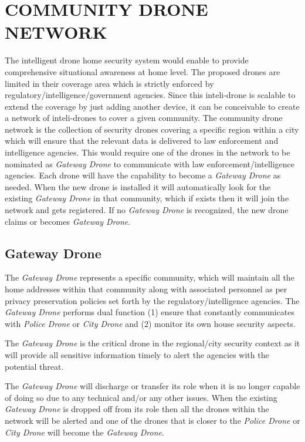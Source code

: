 \documentclass[sigconf]{acmart}
\begin{document}
\section{COMMUNITY DRONE NETWORK}
The intelligent drone home security system would enable to provide comprehensive situational awareness at home level. The proposed drones are limited in their coverage area which is strictly enforced by regulatory/intelligence/government agencies. Since this inteli-drone is scalable to extend the coverage by just adding another device, it can be conceivable to create a network of inteli-drones to cover a given community. The community drone network is the collection of security drones covering a specific region within a city which will ensure that the relevant data is delivered to law enforcement and intelligence agencies. This would require one of the drones in the network to be nominated as \textit{Gateway Drone} to communicate with law enforcement/intelligence agencies. Each drone will have the capability to become a \textit{Gateway Drone} as needed. When the new drone is installed it will automatically look for the existing \textit{Gateway Drone} in that community, which if exists then it will join the network and gets registered. If no \textit{Gateway Drone} is recognized, the new drone claims or becomes \textit{Gateway Drone}.

\subsection{Gateway Drone}
The \textit{Gateway Drone} represents a specific community, which will maintain all the home addresses within that community along with associated personnel as per privacy preservation policies set forth by the regulatory/intelligence agencies. The \textit{Gateway Drone} performs dual function (1) ensure that constantly communicates with \textit{Police Drone} or \textit{City Drone} and (2) monitor its own house security aspects.

The \textit{Gateway Drone} is the critical drone in the regional/city security context as it will provide all sensitive information timely to alert the agencies with the potential threat.

The \textit{Gateway Drone} will discharge or transfer its role when it is no longer capable of doing so due to any technical and/or any other issues. When the existing \textit{Gateway Drone} is dropped off from its role then all the drones within the network will be alerted and one of the drones that is closer to the \textit{Police Drone} or \textit{City Drone} will become the \textit{Gateway Drone}. 
\end{document}
